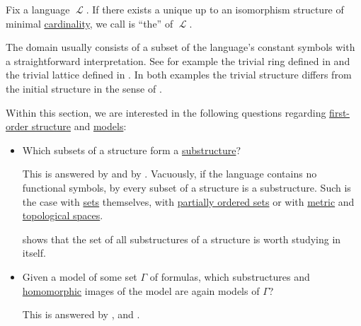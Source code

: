 \begin{remark}\label{rem:trivial_structure}
  Fix a language \( \mscrL \). If there exists a unique up to an isomorphism structure of minimal \hyperref[thm:cardinality_existence]{cardinality}, we call is \enquote{the}  of \( \mscrL \).

  The domain usually consists of a subset of the language's constant symbols with a straightforward interpretation. See for example the trivial ring defined in  and the trivial lattice defined in . In both examples the trivial structure differs from the initial structure in the sense of .
\end{remark}

\begin{remark}\label{rem:questions_regarding_structures}
  Within this section, we are interested in the following questions regarding \hyperref[def:first_order_structure]{first-order structure} and \hyperref[def:first_order_model]{models}:

  \begin{itemize}
    \item Which subsets of a structure form a \hyperref[def:first_order_substructure]{substructure}?

    This is answered by  and by . Vacuously, if the language contains no functional symbols, by  every subset of a structure is a substructure. Such is the case with \hyperref[def:set]{sets} themselves, with \hyperref[def:partially_ordered_set]{partially ordered sets} or with \hyperref[def:metric_space]{metric} and \hyperref[def:topological_space]{topological spaces}.

     shows that the set of all substructures of a structure is worth studying in itself.

    \item Given a model of some set \( \Gamma \) of formulas, which substructures and \hyperref[def:first_order_homomorphism]{homomorphic} images of the model are again models of \( \Gamma \)?

    This is answered by ,  and .
  \end{itemize}
\end{remark}

